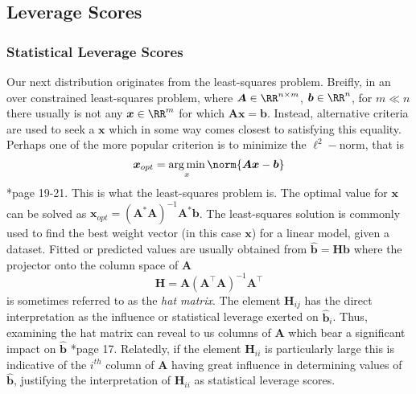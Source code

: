 \subsection{Leverage Scores}\label{Section2.3}

\subsubsection{Statistical Leverage Scores}
Our next distribution originates from the least-squares problem. Breifly, in an over constrained least-squares problem, where $\bm{A} \in \RR^{n \times m}$, $\bm{b} \in \RR^{n}$, for $m \ll n$ there usually is not any $\bm{x} \in \RR^{m}$ for which $\bm{A} \bm{x} = \bm{b}$. Instead, alternative criteria are used to seek a $\bm{x}$ which in some way comes closest to satisfying this equality. Perhaps one of the more popular criterion is to minimize the $\ell^2-$norm, that is
\[
    \bm{x}_{opt} = \argmin_{x} \norm{\bm{A} \bm{x} - \bm{b}}
\]
\cite{DBLP:journals/corr/abs-1104-5557}*{page 19-21}. This is what the least-squares problem is. The optimal value for $\bm{x}$ can be solved as $\bm{x}_{opt} = \left( \bm{A}^{\ast} \bm{A} \right)^{-1} \bm{A}^{\ast} \bm{b}$. The least-squares solution is commonly used to find the best weight vector (in this case $\bm{x}$) for a linear model, given a dataset. Fitted or predicted values are usually obtained from $\hat{\bm{b}} = \bm{H} \bm{b}$ where the projector onto the column space of $\bm{A}$
\[
    \bm{H} = \bm{A} \left( \bm{A}^{\intercal} \bm{A} \right)^{-1} \bm{A}^{\intercal}
\]
is sometimes referred to as the {\it hat matrix}. The element $\bm{H}_{ij}$ has the direct interpretation as the influence or statistical leverage exerted on $\hat{\bm{b}}_i$. Thus, examining the hat matrix can reveal to us columns of $\bm{A}$ which bear a significant impact on $\hat{\bm{b}}$ \cite{HoaglinDavidC1978THMi}*{page 17}. Relatedly, if the element $\bm{H}_{ii}$ is particularly large this is indicative of the $i^{th}$ column of $\bm{A}$ having great influence in determining values of $\hat{\bm{b}}$, justifying the interpretation of $\bm{H}_{ii}$ as statistical leverage scores.

